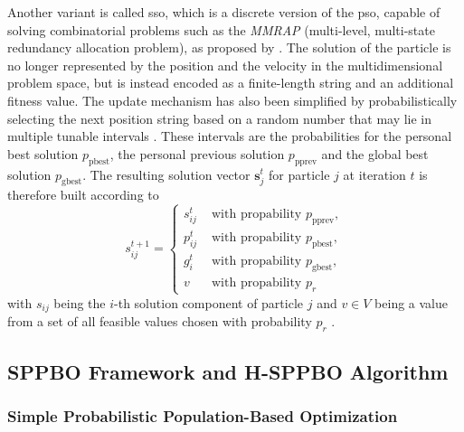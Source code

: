 Another variant is called \gls{sso}, which is a discrete version of the \gls{pso}, capable of solving combinatorial problems such as the \textit{MMRAP} (multi-level, multi-state redundancy allocation problem), as proposed by \citet{yeh2009two}. The solution of the particle is no longer represented by the position and the velocity in the multidimensional problem space, but is instead encoded as a finite-length string and an additional fitness value. The update mechanism has also been simplified by probabilistically selecting the next position string based on a random number that may lie in multiple tunable intervals \cite{yeh2012simplified}. These intervals are the probabilities for the personal best solution $p_{\text{pbest}}$, the personal previous solution $p_{\text{pprev}} $ and the global best solution $p_{\text{gbest}}$. The resulting solution vector $\mathbf{s}^t_j$ for particle $j$ at iteration $t$ is therefore built according to
\begin{equation}
	\label{eq:sso_rule}
	s_{ij}^{t+1} = \begin{cases}
		s^t_{ij} & \text{ with propability } p_{\text{pprev}}, \\
		p^t_{ij} & \text{ with propability } p_{\text{pbest}}, \\
		g^t_{i} &\text{ with propability } p_{\text{gbest}}, \\
		v & \text{ with propability } p_{r}
	\end{cases}
\end{equation}
with $s_{ij}$ being the $i$-th solution component of particle $j$ and $v \in V$ being a value from a set of all feasible values chosen with probability $p_r$ \cite{lin2015simple}. 


\subsection{SPPBO Framework and H-SPPBO Algorithm}

\subsubsection{Simple Probabilistic Population-Based Optimization}

